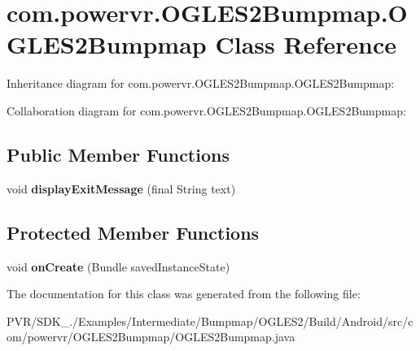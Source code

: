 \hypertarget{classcom_1_1powervr_1_1_o_g_l_e_s2_bumpmap_1_1_o_g_l_e_s2_bumpmap}{\section{com.\+powervr.\+O\+G\+L\+E\+S2\+Bumpmap.\+O\+G\+L\+E\+S2\+Bumpmap Class Reference}
\label{classcom_1_1powervr_1_1_o_g_l_e_s2_bumpmap_1_1_o_g_l_e_s2_bumpmap}
}


Inheritance diagram for com.\+powervr.\+O\+G\+L\+E\+S2\+Bumpmap.\+O\+G\+L\+E\+S2\+Bumpmap\+:


Collaboration diagram for com.\+powervr.\+O\+G\+L\+E\+S2\+Bumpmap.\+O\+G\+L\+E\+S2\+Bumpmap\+:
\subsection*{Public Member Functions}
\begin{DoxyCompactItemize}
\item 
\hypertarget{classcom_1_1powervr_1_1_o_g_l_e_s2_bumpmap_1_1_o_g_l_e_s2_bumpmap_ac2522d8193d5c5a85666afdc524dcbfe}{void {\bfseries display\+Exit\+Message} (final String text)}\label{classcom_1_1powervr_1_1_o_g_l_e_s2_bumpmap_1_1_o_g_l_e_s2_bumpmap_ac2522d8193d5c5a85666afdc524dcbfe}

\end{DoxyCompactItemize}
\subsection*{Protected Member Functions}
\begin{DoxyCompactItemize}
\item 
\hypertarget{classcom_1_1powervr_1_1_o_g_l_e_s2_bumpmap_1_1_o_g_l_e_s2_bumpmap_ad515f54ebafc755944de824a71240512}{void {\bfseries on\+Create} (Bundle saved\+Instance\+State)}\label{classcom_1_1powervr_1_1_o_g_l_e_s2_bumpmap_1_1_o_g_l_e_s2_bumpmap_ad515f54ebafc755944de824a71240512}

\end{DoxyCompactItemize}


The documentation for this class was generated from the following file\+:\begin{DoxyCompactItemize}
\item 
P\+V\+R/\+S\+D\+K\+\_./\+Examples/\+Intermediate/\+Bumpmap/\+O\+G\+L\+E\+S2/\+Build/\+Android/src/com/powervr/\+O\+G\+L\+E\+S2\+Bumpmap/O\+G\+L\+E\+S2\+Bumpmap.\+java\end{DoxyCompactItemize}
